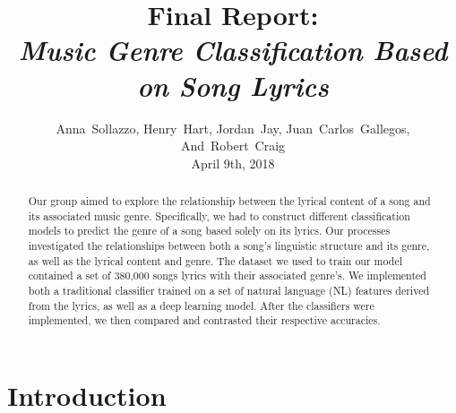 \documentclass[journal]{IEEEtran}
\begin{document}
\title{Final Report:\\\emph{Music Genre Classification Based on Song Lyrics}}

\author{Anna~Sollazzo,
        Henry~Hart,
        Jordan~Jay,
        Juan~Carlos~Gallegos,
        And~Robert~Craig \\ April 9th, 2018}

\maketitle


\begin{abstract}

    Our group aimed to explore the relationship between the lyrical content of a song and its associated music genre. Specifically, we had to construct different classification models to predict the genre of a song based solely on its lyrics. Our processes investigated the relationships between both a song's linguistic structure and its genre, as well as the lyrical content and genre. The dataset we used to train our model contained a set of 380,000 songs lyrics with their associated genre's. We implemented both a traditional classifier trained on a set of natural language (NL) features derived from the lyrics, as well as a deep learning model. After the classifiers were implemented, we then compared and contrasted their respective accuracies.\par

\end{abstract}

\section{Introduction}
\end{document}
